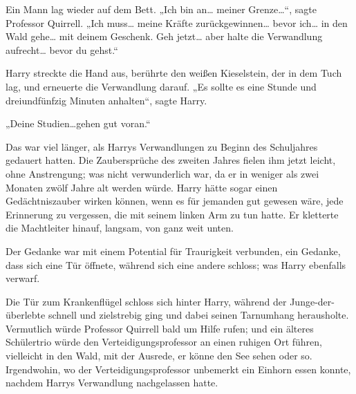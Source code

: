 Ein Mann lag wieder auf dem Bett.
„Ich bin an… meiner Grenze…“, sagte Professor Quirrell. „Ich muss… meine Kräfte zurückgewinnen… bevor ich… in den Wald gehe… mit deinem Geschenk. Geh jetzt… aber halte die Verwandlung aufrecht… bevor du gehst.“

Harry streckte die Hand aus, berührte den weißen Kieselstein, der in dem Tuch lag, und erneuerte die Verwandlung darauf.
„Es sollte es eine Stunde und dreiundfünfzig Minuten anhalten“, sagte Harry.

„Deine Studien…gehen gut voran.“

Das war viel länger, als Harrys Verwandlungen zu Beginn des Schuljahres gedauert hatten. Die Zaubersprüche des zweiten Jahres fielen ihm jetzt leicht, ohne Anstrengung; was nicht verwunderlich war, da er in weniger als zwei Monaten zwölf Jahre alt werden würde. Harry hätte sogar einen Gedächtniszauber wirken können, wenn es für jemanden gut gewesen wäre, jede Erinnerung zu vergessen, die mit seinem linken Arm zu tun hatte.
Er kletterte die Machtleiter hinauf, langsam, von ganz weit unten.

Der Gedanke war mit einem Potential für Traurigkeit verbunden, ein Gedanke, dass sich eine Tür öffnete, während sich eine andere schloss; was Harry ebenfalls verwarf.

\later

Die Tür zum Krankenflügel schloss sich hinter Harry, während der Junge-der-überlebte schnell und zielstrebig ging und dabei seinen Tarnumhang herausholte.
Vermutlich würde Professor Quirrell bald um Hilfe rufen; und ein älteres Schülertrio würde den Verteidigungsprofessor an einen ruhigen Ort führen, vielleicht in den Wald, mit der Ausrede, er könne den See sehen oder so. Irgendwohin, wo der Verteidigungsprofessor unbemerkt ein Einhorn essen konnte, nachdem Harrys Verwandlung nachgelassen hatte.


